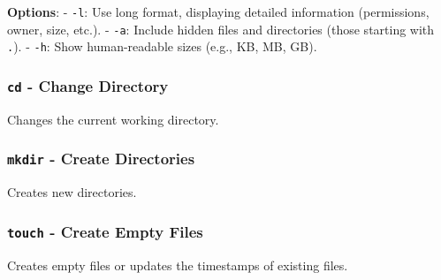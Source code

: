 \documentclass[11pt,a4paper]{article}
\begin{document}
\textbf{Options}: - \texttt{-l}: Use long format, displaying detailed
information (permissions, owner, size, etc.). - \texttt{-a}: Include
hidden files and directories (those starting with \texttt{.}). -
\texttt{-h}: Show human-readable sizes (e.g., KB, MB, GB).

\subsubsection{\texorpdfstring{\texttt{cd} - Change
Directory}{cd - Change Directory}}\label{cd---change-directory}

Changes the current working directory.

\begin{Shaded}
\begin{Highlighting}[]
 \PreprocessorTok{[}\PreprocessorTok{]}
\end{Highlighting}
\end{Shaded}

\subsubsection{\texorpdfstring{\texttt{mkdir} - Create
Directories}{mkdir - Create Directories}}\label{mkdir---create-directories}

Creates new directories.

\begin{Shaded}
\begin{Highlighting}[]
 \PreprocessorTok{[}\PreprocessorTok{]}
\end{Highlighting}
\end{Shaded}

\subsubsection{\texorpdfstring{\texttt{touch} - Create Empty
Files}{touch - Create Empty Files}}\label{touch---create-empty-files}

Creates empty files or updates the timestamps of existing files.

\begin{Shaded}
\begin{Highlighting}[]
 \PreprocessorTok{[}\PreprocessorTok{]}
\end{Highlighting}
\end{Shaded}
\end{document}
